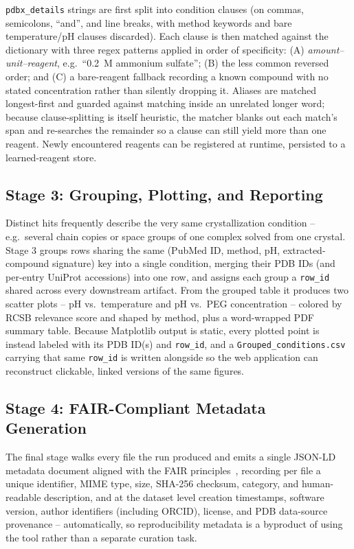 \texttt{pdbx\_details} strings are first split into condition clauses
(on commas, semicolons, ``and'', and line breaks, with method keywords
and bare temperature/pH clauses discarded). Each clause is then matched
against the dictionary with three regex patterns applied in order of
specificity: (A) \emph{amount--unit--\allowbreak reagent}, e.g.\ ``0.2~M
ammonium sulfate''; (B) the less common reversed order; and (C) a
bare-reagent fallback recording a known compound with no stated
concentration rather than silently dropping it. Aliases are matched
longest-first and guarded against matching inside an unrelated longer
word; because clause-splitting is itself heuristic, the matcher blanks
out each match's span and re-searches the remainder so a clause can
still yield more than one reagent. Newly encountered reagents can be
registered at runtime, persisted to a learned-reagent store.

\subsection{Stage 3: Grouping, Plotting, and Reporting}

Distinct hits frequently describe the very same crystallization
condition -- e.g.\ several chain copies or space groups of one complex
solved from one crystal. Stage 3 groups rows sharing the same (PubMed
ID, method, pH, extracted-compound signature) key into a single
condition, merging their PDB IDs (and per-entry UniProt accessions) into
one row, and assigns each group a \texttt{row\_id} shared across every
downstream artifact. From the grouped table it produces two scatter
plots -- pH vs.\ temperature and pH vs.\ PEG concentration -- colored by
RCSB relevance score and shaped by method, plus a word-wrapped PDF
summary table. Because Matplotlib output is static, every plotted point
is instead labeled with its PDB ID(s) and \texttt{row\_id}, and a
\texttt{Grouped\_conditions.csv} carrying that same \texttt{row\_id} is
written alongside so the web application  can reconstruct
clickable, linked versions of the same figures.

\subsection{Stage 4: FAIR-Compliant Metadata Generation}

The final stage walks every file the run produced and emits a single
JSON-LD metadata document aligned with the FAIR
principles~\cite{wilkinson2016fair}, recording per file a unique
identifier, MIME type, size, SHA-256 checksum, category, and
human-readable description, and at the dataset level creation
timestamps, software version, author identifiers (including ORCID),
license, and PDB data-source provenance -- automatically, so
reproducibility metadata is a byproduct of using the tool rather than a
separate curation task.

